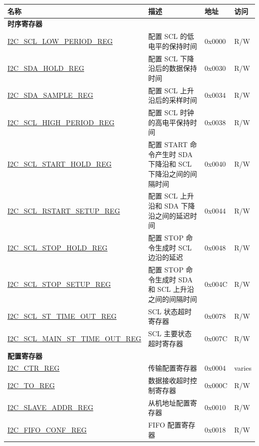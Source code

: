 \begin{longtable}{ | p{6cm} | p{7cm} | p{1.3cm} | p{1cm} | }
    \hline\rowcolor{lightgray}
    名称 & 描述 &  地址 & 访问 \\ \hline
    \endhead
    \multicolumn{4}{|l|}{\textbf{时序寄存器}} \\ \hline
    \hyperref[regdesc:I2CSCLLOWPERIODREG]{I2C\_SCL\_LOW\_PERIOD\_REG} & 配置 SCL 的低电平的保持时间 & 0x0000 & R/W \\ \hline
    \hyperref[regdesc:I2CSDAHOLDREG]{I2C\_SDA\_HOLD\_REG} & 配置 SCL 下降沿后的数据保持时间 & 0x0030 & R/W \\ \hline
    \hyperref[regdesc:I2CSDASAMPLEREG]{I2C\_SDA\_SAMPLE\_REG} & 配置 SCL 上升沿后的采样时间 & 0x0034 & R/W \\ \hline
    \hyperref[regdesc:I2CSCLHIGHPERIODREG]{I2C\_SCL\_HIGH\_PERIOD\_REG} & 配置 SCL 时钟的高电平保持时间 & 0x0038 & R/W \\ \hline
    \hyperref[regdesc:I2CSCLSTARTHOLDREG]{I2C\_SCL\_START\_HOLD\_REG} & 配置 START 命令产生时 SDA 下降沿和 SCL 下降沿之间的间隔时间 & 0x0040 & R/W \\ \hline
    \hyperref[regdesc:I2CSCLRSTARTSETUPREG]{I2C\_SCL\_RSTART\_SETUP\_REG} & 配置 SCL 上升沿和 SDA 下降沿之间的延迟时间 & 0x0044 & R/W \\ \hline
    \hyperref[regdesc:I2CSCLSTOPHOLDREG]{I2C\_SCL\_STOP\_HOLD\_REG} & 配置 STOP 命令生成时 SCL 边沿的延迟 & 0x0048 & R/W \\ \hline
    \hyperref[regdesc:I2CSCLSTOPSETUPREG]{I2C\_SCL\_STOP\_SETUP\_REG} & 配置 STOP 命令生成时 SDA 和 SCL 上升沿之间的间隔时间 & 0x004C & R/W \\ \hline
    \hyperref[regdesc:I2CSCLSTTIMEOUTREG]{I2C\_SCL\_ST\_TIME\_OUT\_REG} & SCL 状态超时寄存器 & 0x0078 & R/W \\ \hline
    \hyperref[regdesc:I2CSCLMAINSTTIMEOUTREG]{I2C\_SCL\_MAIN\_ST\_TIME\_OUT\_REG} & SCL 主要状态超时寄存器 & 0x007C & R/W \\ \hline
    \multicolumn{4}{|l|}{\textbf{配置寄存器}} \\ \hline
    \hyperref[regdesc:I2CCTRREG]{I2C\_CTR\_REG} & 传输配置寄存器 & 0x0004 & varies \\ \hline
    \hyperref[regdesc:I2CTOREG]{I2C\_TO\_REG} & 数据接收超时控制寄存器 & 0x000C & R/W \\ \hline
    \hyperref[regdesc:I2CSLAVEADDRREG]{I2C\_SLAVE\_ADDR\_REG} & 从机地址配置寄存器 & 0x0010 & R/W \\ \hline
    \hyperref[regdesc:I2CFIFOCONFREG]{I2C\_FIFO\_CONF\_REG} & FIFO 配置寄存器 & 0x0018 & R/W \\ \hline

\end{longtable}
